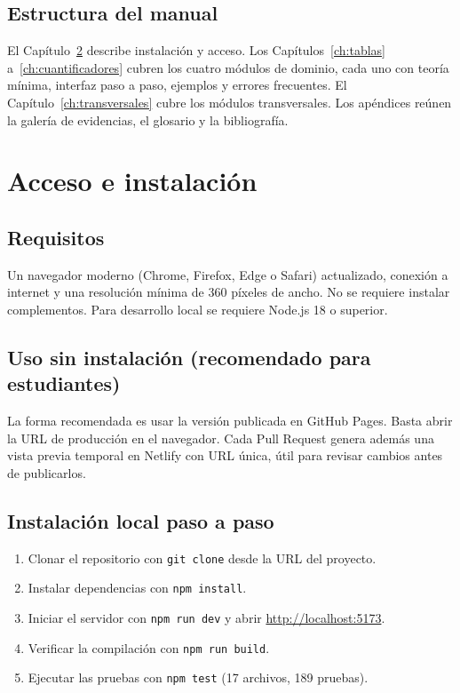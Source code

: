 \documentclass[11pt,a4paper,openany]{book}
\begin{document}
\section{Estructura del manual}
El Cap\'itulo~\ref{ch:acceso} describe instalaci\'on y acceso. Los Cap\'itulos~\ref{ch:tablas} a~\ref{ch:cuantificadores} cubren los cuatro m\'odulos de dominio, cada uno con teor\'ia m\'inima, interfaz paso a paso, ejemplos y errores frecuentes. El Cap\'itulo~\ref{ch:transversales} cubre los m\'odulos transversales. Los ap\'endices re\'unen la galer\'ia de evidencias, el glosario y la bibliograf\'ia.

\chapter{Acceso e instalaci\'on}
\label{ch:acceso}
\section{Requisitos}
Un navegador moderno (Chrome, Firefox, Edge o Safari) actualizado, conexi\'on a internet y una resoluci\'on m\'inima de 360 p\'ixeles de ancho. No se requiere instalar complementos. Para desarrollo local se requiere Node.js 18 o superior.

\section{Uso sin instalaci\'on (recomendado para estudiantes)}
La forma recomendada es usar la versi\'on publicada en GitHub Pages. Basta abrir la URL de producci\'on en el navegador. Cada Pull Request genera adem\'as una vista previa temporal en Netlify con URL \'unica, \'util para revisar cambios antes de publicarlos.

\section{Instalaci\'on local paso a paso}
\begin{enumerate}[leftmargin=*]
\item Clonar el repositorio con \texttt{git clone} desde la URL del proyecto.
\item Instalar dependencias con \texttt{npm install}.
\item Iniciar el servidor con \texttt{npm run dev} y abrir \url{http://localhost:5173}.
\item Verificar la compilaci\'on con \texttt{npm run build}.
\item Ejecutar las pruebas con \texttt{npm test} (17 archivos, 189 pruebas).
\end{enumerate}
\end{document}
